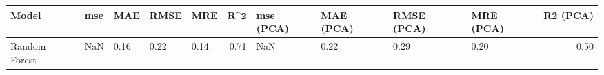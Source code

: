 \begin{table}
\centering
\label{table:iri_reg_pred}
\begin{tabular}{lllllrllllr}
\toprule
\textbf{Model} & \textbf{mse} & \textbf{MAE} & \textbf{RMSE} & \textbf{MRE} & $\textbf{R^2}$ & \textbf{mse (PCA)} & \textbf{MAE (PCA)} & \textbf{RMSE (PCA)} & \textbf{MRE (PCA)} & \textbf{R2 (PCA)} \\
\midrule
 Random Forest &          NaN &         0.16 &          0.22 &         0.14 &           0.71 &                NaN &               0.22 &                0.29 &               0.20 &              0.50 \\
\bottomrule
\end{tabular}
\end{table}
